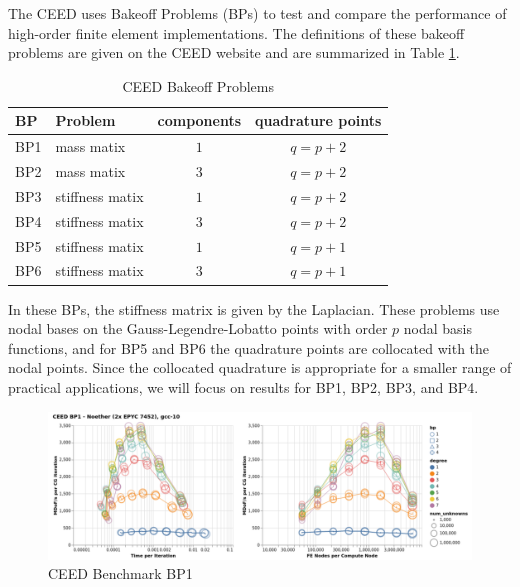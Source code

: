 The CEED uses Bakeoff Problems (BPs) to test and compare the performance of high-order finite element implementations.
The definitions of these bakeoff problems are given on the CEED website \cite{ceed-bps} and are summarized in Table \ref{table:ceedbps}.

\begin{table}[ht!]
\begin{center}
\begin{tabular}{l l c c}
  \toprule
  BP  & Problem         & components & quadrature points  \\
  \toprule
  BP1 & mass matix      & $1$        & $q = p + 2$        \\
  BP2 & mass matix      & $3$        & $q = p + 2$        \\
  \midrule
  BP3 & stiffness matix & $1$        & $q = p + 2$        \\
  BP4 & stiffness matix & $3$        & $q = p + 2$        \\
  \midrule
  BP5 & stiffness matix & $1$        & $q = p + 1$        \\
  BP6 & stiffness matix & $3$        & $q = p + 1$        \\
  \bottomrule
\end{tabular}
\end{center}
\caption{CEED Bakeoff Problems}
\label{table:ceedbps}
\end{table}

In these BPs, the stiffness matrix is given by the Laplacian.
These problems use nodal bases on the Gauss-Legendre-Lobatto points with order $p$ nodal basis functions, and for BP5 and BP6 the quadrature points are collocated with the nodal points.
Since the collocated quadrature is appropriate for a smaller range of practical applications, we will focus on results for BP1, BP2, BP3, and BP4.

\begin{figure}[ht!]
\includegraphics[width=.99\linewidth]{../img/xsmmBlockedBP1Clip}
\caption{CEED Benchmark BP1}
\label{fig:bp1}
\end{figure}

